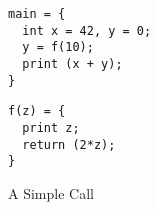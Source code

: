 \label{sec:running-example}

\begin{figure}[b]
    \begin{minipage}{.3\textwidth}
\begin{verbatim}
main = {
  int x = 42, y = 0;
  y = f(10);
  print (x + y);
}
\end{verbatim}
    \end{minipage}
    \begin{minipage}{.3\textwidth}
\begin{verbatim}
f(z) = {
  print z;
  return (2*z);
}
\end{verbatim}
    \end{minipage}
\caption{A Simple Call}
\label{fig:simple-program}
\end{figure}


\newcommand*{\add}{\textsc{add}}
\newcommand*{\addi}{\textsc{addi}}
\newcommand*{\sw}{\textsc{sw}}
\newcommand*{\lw}{\textsc{lw}}
\newcommand*{\jal}{\textsc{jal}}
\newcommand*{\jalr}{\textsc{jalr}}
\newcommand*{\rra}{\textsc{ra}}
\newcommand*{\rout}{\textsc{out}}

\newcommand*{\tagInstr}{\textsc{instr}}
\newcommand*{\tagCall}{\textsc{call}}
\newcommand*{\tagHa}{\textsc{h1}}
\newcommand*{\tagHb}{\textsc{h2}}
\newcommand*{\tagRa}{\textsc{r1}}
\newcommand*{\tagRb}{\textsc{r2}}
\newcommand*{\tagRc}{\textsc{r3}}
\newcommand*{\tagNoDepth}{\textsc{unused}}
\newcommand*{\tagStackDepth}[1]{\textsc{stack} ~ #1}
\newcommand*{\tagPCDepth}[1]{\textsc{pc} ~ #1}
\newcommand*{\tagSP}{\textsc{sp}}

\setcounter{pcctr}{0}
\newcommand*{\row}[4]{
  \thepcctr & \stepcounter{pcctr} #2 & #3 & \text{#4}\\
}
\newcommand*{\tracerow}[5]{
  #1 & #2 & #3 & #4 & \text{#5}\\
}
\newcommand*{\summary}[6]{
\[
\begin{array}{cccccc}
  \PCname = #1 & r_0 = #2 & \rra = #3 & \rsp = #4 & r_4 = #5 & r_5 = #6
\end{array}
\]
}
\newcommand{\negate}{\textrm{-}}


\newcommand{\instrc}{lgray}
\newcommand{\mainsealc}{cyan}
\newcommand{\fsealc}{green}
\newcommand{\unsealc}{gray}
\newcommand{\emptyoutc}{white} %
\newcommand{\fulloutc}{white}

